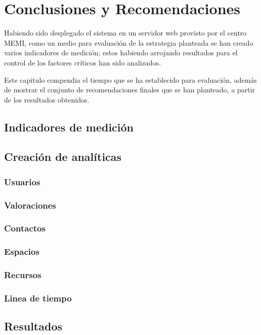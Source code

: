 \chapter{Conclusiones y Recomendaciones}

Habiendo sido desplegado el sistema en un servidor web provisto por el centro
MEMI, como un medio para evaluación de la estrategia planteada se han creado
varios indicadores de medición; estos habiendo arrojando resultados para el
control de los factores críticos han sido analizados.

Este capitulo compendia el tiempo que se ha establecido para evaluación, además
de mostrar el conjunto de recomendaciones finales que se han planteado, a partir
de los resultados obtenidos.

\section{Indicadores de medición}

\section{Creación de analíticas}

\subsection{Usuarios}
\subsection{Valoraciones}
\subsection{Contactos}
\subsection{Espacios}
\subsection{Recursos}
\subsection{Linea de tiempo}

\section{Resultados}

